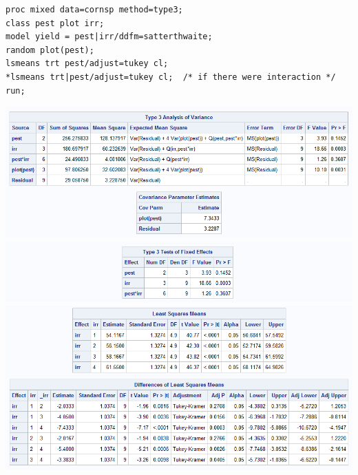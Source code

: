\begin{small}
\begin{verbatim}
proc mixed data=cornsp method=type3;
class pest plot irr;
model yield = pest|irr/ddfm=satterthwaite;
random plot(pest);
lsmeans trt pest/adjust=tukey cl;
*lsmeans trt|pest/adjust=tukey cl;  /* if there were interaction */
run;
\end{verbatim}
\end{small}

\begin{center}
\includegraphics[scale=0.7]{CornSp1}\\
\includegraphics[scale=0.7]{CornSp2}\\
\includegraphics[scale=0.7]{CornSp3}\\
\end{center}

\newpage

